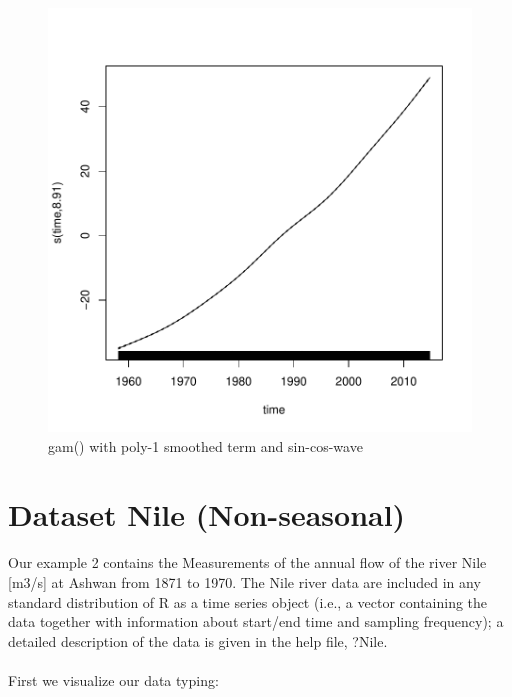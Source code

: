 \documentclass[10pt, a4paper]{article} %
\begin{document}
\begin{figure}[H]
\centering
\begin{Schunk}
\end{Schunk}
\includegraphics{FINAL_VERSION-080}
\caption{gam() with poly-1 smoothed term and sin-cos-wave}
\end{figure}


\section{Dataset Nile (Non-seasonal)}
\noindent Our example 2 contains the Measurements of the annual flow of the river Nile [m3/s] at Ashwan from 1871 to 1970. The Nile river data are included in any standard distribution of R as a time series object (i.e., a vector containing the data together with information about start/end time and sampling frequency); a detailed description of the data is given in the help file, ?Nile. \\
\\
First we visualize our data typing:
\end{document}
